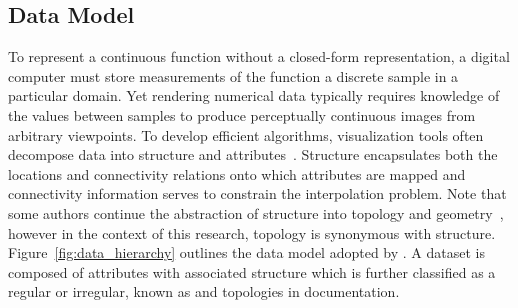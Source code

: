 \subsection{Data Model}
To represent a continuous function without a closed-form
representation, a digital computer must store measurements of the
function a discrete sample in a particular domain. Yet
rendering numerical data typically requires knowledge of the values
between samples to produce perceptually continuous images from
arbitrary viewpoints. To develop efficient algorithms, visualization
tools often decompose data into structure and
attributes~\cite{vtk}. Structure encapsulates both the locations and
connectivity relations onto which attributes are mapped and
connectivity information serves to constrain the interpolation
problem. Note that some authors continue the abstraction of structure
into topology and geometry~\cite{weiler}, however in the context of
this research, topology is synonymous with
structure. Figure~\ref{fig:data_hierarchy} outlines the data model
adopted by \sciwms{}. A dataset is composed of attributes with
associated structure which is further classified as a regular or
irregular, known as {\bf \cgrid{} } and {\bf \ugrid{}} topologies in
\sciwms{} documentation.
